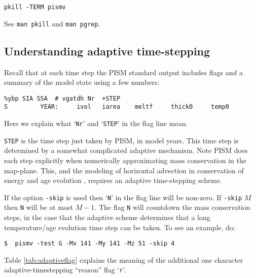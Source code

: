   \verb|pkill -TERM pismv|

\noindent See \verb|man pkill| and \verb|man pgrep|.



\subsection{Understanding adaptive time-stepping} \label{subsect:adapt} Recall that at each time step the PISM standard output includes flags and a summary of the model state using a few numbers:
\begin{verbatim}
%ybp SIA SSA  # vgatdh Nr  +STEP
S         YEAR:     ivol   iarea    meltf     thick0     temp0
\end{verbatim}
Here we explain what `\verb|Nr|' and `\verb|STEP|' in the flag line mean.

\verb|STEP| is the time step just taken by PISM, in model years.  This time step is determined by a somewhat complicated adaptive mechanism.  Note PISM does each step explicitly when numerically approximating mass conservation in the map-plane.  This, and the modeling of horizontal advection in conservation of energy and age evolution \cite{BBL}, requires an adaptive time-stepping scheme.

If the option \verb|-skip| is used then `\verb|N|' in the flag line will be non-zero.  If \verb|-skip| $M$ then \verb|N| will be at most $M-1$.  The flag \verb|N| will countdown the mass conservation steps, in the case that the adaptive scheme determines that a long temperature/age evolution time step can be taken.  To see an example, do:

\verb|$  pismv -test G -Mx 141 -My 141 -Mz 51 -skip 4|

Table \ref{tab:adaptiveflag} explains the meaning of the additional one character adaptive-timestepping ``reason'' flag `\verb|r|'.

